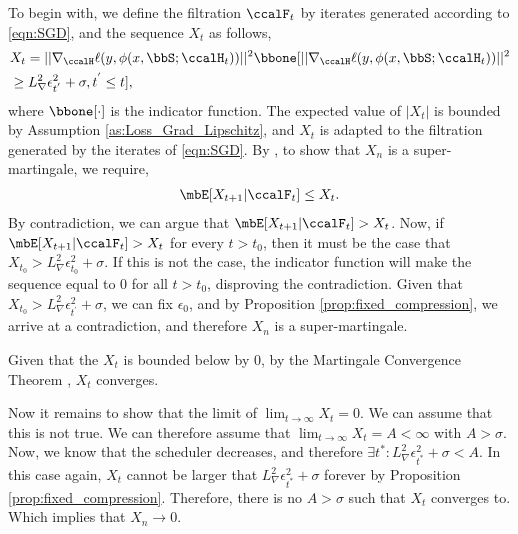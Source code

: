 
To begin with, we define the filtration $\ccalF_t$ by iterates generated according to \eqref{eqn:SGD}, and the sequence $X_t$ as follows, 
\begin{align}
	&X_t = ||\nabla_\ccalH \ell (y,\phi(x,\bbS;\ccalH_t))||^2\bbone[||\nabla_\ccalH \ell (y,\phi(x,\bbS;\ccalH_t))||^2\nonumber\\
 &\geq  L_\nabla^2 \epsilon^2_{t^{'}}+\sigma, t^{'}\leq t],
\end{align}
where $\bbone[\cdot]$ is the indicator function. The expected value of $|X_t|$ is bounded by Assumption \ref{as:Loss_Grad_Lipschitz}, and $X_t$ is adapted to the filtration generated by the iterates of \ref{eqn:SGD}. 
By \cite{durrett2019probability}, to show that $X_n$ is a super-martingale, we require, 
\begin{align}
	\mbE[X_{t+1}|\ccalF_t]\leq X_t.
\end{align}
By contradiction, we can argue that $\mbE[X_{t+1}|\ccalF_t]> X_t$. Now, if $\mbE[X_{t+1}|\ccalF_t]> X_t$ for every $t>t_0$, then it must be the case that $X_{t_0}>L_\nabla^2 \epsilon^2_{t_0}+\sigma$. If this is not the case, the indicator function will make the sequence equal to $0$ for all $t>t_0$, disproving the contradiction. Given that $X_{t_0}>L_\nabla^2 \epsilon^2_{t^{'}}+\sigma$, we can fix $\epsilon_0$, and by Proposition \ref{prop:fixed_compression}, we arrive at a contradiction, and therefore $X_n$ is a super-martingale.

Given that the $X_t$ is bounded below by $0$, by the  Martingale Convergence Theorem \cite[Theorem 4.2.1]{durrett2019probability}, $X_t$ converges. 

Now it remains to show that the limit of $\lim_{t\to\infty}X_t=0$. We can assume that this is not true. We can therefore assume that $\lim_{t\to\infty}X_t=A<\infty$ with $A>\sigma$. Now, we know that the scheduler decreases, and therefore $\exists t^*:L^2_\nabla\epsilon^2_{t^*}+\sigma<A$. In this case again, $X_t$ cannot be larger that  $L^2_\nabla\epsilon^2_{t^*}+\sigma$ forever by Proposition \ref{prop:fixed_compression}. Therefore, there is no $A>\sigma$ such that $X_t$ converges to. Which implies that $X_n\to 0$.


